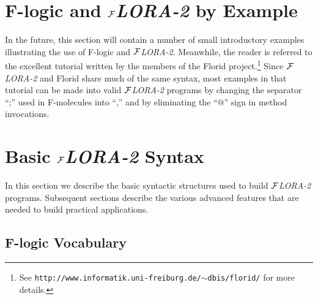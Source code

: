 \documentclass[11pt]{article}
\newcommand{\FLORA}{{\mbox{${\cal F}${\small\it LORA}\rm\emph{-2}}}\xspace}
\newcommand{\FLORID}{{\mbox{\sc Florid}}\xspace}
\newcommand{\fl}{\mbox{F-logic}\xspace}
\begin{document}
 
\section{\fl and \FLORA by Example}


In the future, this section will contain a number of small
introductory examples illustrating the use of \fl and \FLORA. Meanwhile, the
reader is referred to the excellent tutorial written by the members of the
\FLORID project.\footnote{
  See {\tt http://www.informatik.uni-freiburg.de/$\sim$dbis/florid/} for more
  details.
  }
Since \FLORA and \FLORID share much of the same syntax, most examples in that
tutorial can be made into valid \FLORA programs by changing the separator
``;'' used in F-molecules into ``,'' and by eliminating the ``@''
sign in method invocations.



\section{Basic \FLORA Syntax}

In this section we describe the basic syntactic structures used to build
\FLORA programs. Subsequent sections describe the various advanced features
that are needed to build practical applications.


\subsection{\fl Vocabulary}\label{sec-basic-flogic}
\end{document}
